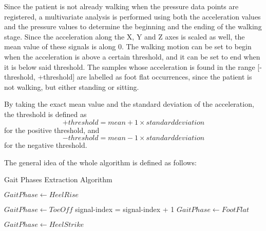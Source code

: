 Since the patient is not already walking when the pressure data points are registered, a multivariate analysis is performed using both the acceleration values and the pressure values to determine the beginning and the ending of the walking stage. 
Since the acceleration along the X, Y and Z axes is scaled as well, the mean value of these signals is along 0. 
The walking motion can be set to begin when the acceleration is above a certain threshold, and it can be set to end when it is below said threshold. 
The samples whose acceleration is found in the range [- threshold, +threshold] are labelled as foot flat occurrences, since the patient is not walking, but either standing or sitting.


By taking the exact mean value and the standard deviation of the acceleration, the threshold is defined as
\begin{equation}
   +threshold = mean + 1 \times standard deviation
\end{equation}
for the positive threshold, and
\begin{equation}
    -threshold = mean - 1 \times standard deviation
\end{equation}
for the negative threshold.


The general idea of the whole algorithm is defined as follows:

\begin{algorithm}
\caption{Gait Phases Extraction Algorithm}\label{alg:cap}
\begin{algorithmic}[1]


        \State $Gait Phase \gets Heel Rise$
    \EndWhile
    \EndIf


        \State $Gait Phase \gets Toe Off$
        \State signal-index = signal-index + 1
    \EndWhile
    \EndIf
\EndIf
{}
        \State $Gait Phase \gets Foot Flat$
    \EndWhile
    \EndIf

        \State $Gait Phase \gets Heel Strike$
    \EndWhile
    \EndIf
\EndIf
\EndWhile
\end{algorithmic}
\end{algorithm}


